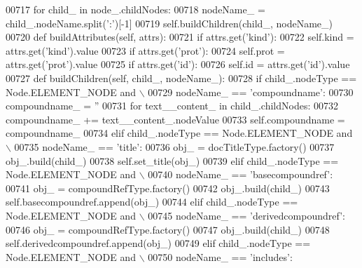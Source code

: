 \begin{DoxyCode}
{{{{{{{{{{{{{{{{{{{{{{{{{{{{{{{{{{{00717         \textcolor{keywordflow}{for} child\_ \textcolor{keywordflow}{in} node\_.childNodes:
00718             nodeName\_ = child\_.nodeName.split(\textcolor{stringliteral}{':'})[-1]
00719             self.buildChildren(child\_, nodeName\_)
00720     \textcolor{keyword}{def }buildAttributes(self, attrs):
00721         \textcolor{keywordflow}{if} attrs.get(\textcolor{stringliteral}{'kind'}):
00722             self.kind = attrs.get(\textcolor{stringliteral}{'kind'}).value
00723         \textcolor{keywordflow}{if} attrs.get(\textcolor{stringliteral}{'prot'}):
00724             self.prot = attrs.get(\textcolor{stringliteral}{'prot'}).value
00725         \textcolor{keywordflow}{if} attrs.get(\textcolor{stringliteral}{'id'}):
00726             self.id = attrs.get(\textcolor{stringliteral}{'id'}).value
00727     \textcolor{keyword}{def }buildChildren(self, child\_, nodeName\_):
00728         \textcolor{keywordflow}{if} child\_.nodeType == Node.ELEMENT\_NODE \textcolor{keywordflow}{and} \(\backslash\)
00729             nodeName\_ == \textcolor{stringliteral}{'compoundname'}:
00730             compoundname\_ = \textcolor{stringliteral}{''}
00731             \textcolor{keywordflow}{for} text\_\_content\_ \textcolor{keywordflow}{in} child\_.childNodes:
00732                 compoundname\_ += text\_\_content\_.nodeValue
00733             self.compoundname = compoundname\_
00734         \textcolor{keywordflow}{elif} child\_.nodeType == Node.ELEMENT\_NODE \textcolor{keywordflow}{and} \(\backslash\)
00735             nodeName\_ == \textcolor{stringliteral}{'title'}:
00736             obj\_ = docTitleType.factory()
00737             obj\_.build(child\_)
00738             self.set_title(obj\_)
00739         \textcolor{keywordflow}{elif} child\_.nodeType == Node.ELEMENT\_NODE \textcolor{keywordflow}{and} \(\backslash\)
00740             nodeName\_ == \textcolor{stringliteral}{'basecompoundref'}:
00741             obj\_ = compoundRefType.factory()
00742             obj\_.build(child\_)
00743             self.basecompoundref.append(obj\_)
00744         \textcolor{keywordflow}{elif} child\_.nodeType == Node.ELEMENT\_NODE \textcolor{keywordflow}{and} \(\backslash\)
00745             nodeName\_ == \textcolor{stringliteral}{'derivedcompoundref'}:
00746             obj\_ = compoundRefType.factory()
00747             obj\_.build(child\_)
00748             self.derivedcompoundref.append(obj\_)
00749         \textcolor{keywordflow}{elif} child\_.nodeType == Node.ELEMENT\_NODE \textcolor{keywordflow}{and} \(\backslash\)
00750             nodeName\_ == \textcolor{stringliteral}{'includes'}:
}}}}}}}}}}}}}}}}}}}}}}}}}}}}}}}}}}}
\end{DoxyCode}
